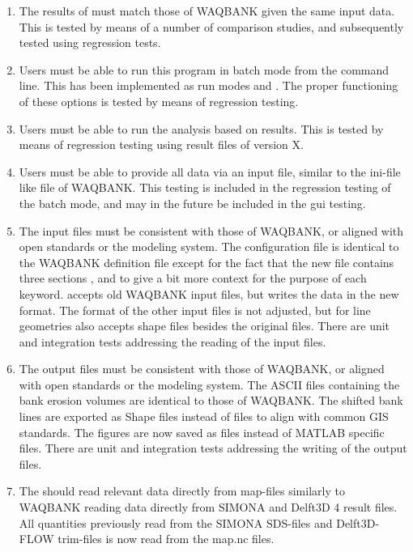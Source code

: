 \begin{enumerate}
\item The results of \dfastbe must match those of WAQBANK given the same input data.
This is tested by means of a number of comparison studies, and subsequently tested using regression tests.

\item Users must be able to run this program in batch mode from the command line.
This has been implemented as run modes  and .
The proper functioning of these options is tested by means of regression testing.

\item Users must be able to run the analysis based on \dflowfm results.
This is tested by means of regression testing using result files of \dflowfm version X.

\item Users must be able to provide all data via an input file, similar to the ini-file like file of WAQBANK.
This testing is included in the regression testing of the batch mode, and may in the future be included in the gui testing.

\item The input files must be consistent with those of WAQBANK, or aligned with open standards or the \dflowfm modeling system.
The \dfastbe configuration file is identical to the WAQBANK definition file except for the fact that the new file contains three sections \keyw{[General]}, \keyw{[Detect]} and \keyw{[Erosion]} to give a bit more context for the purpose of each keyword.
\dfastbe accepts old WAQBANK input files, but writes the data in the new format.
The format of the other input files is not adjusted, but for line geometries \dfastbe also accepts shape files besides the original  files.
There are unit and integration tests addressing the reading of the input files.

\item The output files must be consistent with those of WAQBANK, or aligned with open standards or the \dflowfm modeling system.
The ASCII files containing the bank erosion volumes are identical to those of WAQBANK.
The shifted bank lines are exported as Shape files instead of  files to align with common GIS standards.
The figures are now saved as  files instead of MATLAB specific  files.
There are unit and integration tests addressing the writing of the output files.

\item The should read relevant data directly from \dflowfm map-files similarly to WAQBANK reading data directly from SIMONA and Delft3D 4 result files.
All quantities previously read from the SIMONA SDS-files and Delft3D-FLOW trim-files is now read from the \dflowfm map.nc files.


\end{enumerate}
